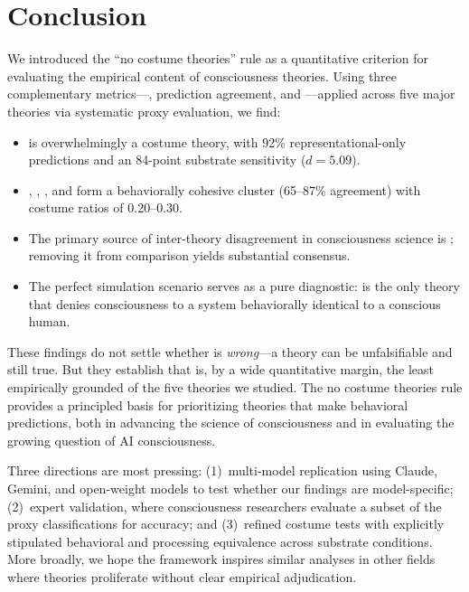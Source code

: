 \section{Conclusion}
\label{sec:conclusion}

We introduced the ``no costume theories'' rule as a quantitative criterion for evaluating the empirical content of consciousness theories.
Using three complementary metrics---\costumeratio, prediction agreement, and \costumesens---applied across five major theories via systematic proxy evaluation, we find:

\begin{itemize}[leftmargin=*,itemsep=2pt,topsep=2pt]
    \item \IIT is overwhelmingly a costume theory, with 92\% representational-only predictions and an 84-point substrate sensitivity ($d = 5.09$).
    \item \GNW, \HOT, \RPT, and \AST form a behaviorally cohesive cluster (65--87\% agreement) with costume ratios of 0.20--0.30.
    \item The primary source of inter-theory disagreement in consciousness science is \IIT; removing it from comparison yields substantial consensus.
    \item The perfect simulation scenario serves as a pure diagnostic: \IIT is the only theory that denies consciousness to a system behaviorally identical to a conscious human.
\end{itemize}

These findings do not settle whether \IIT is \emph{wrong}---a theory can be unfalsifiable and still true.
But they establish that \IIT is, by a wide quantitative margin, the least empirically grounded of the five theories we studied.
The no costume theories rule provides a principled basis for prioritizing theories that make behavioral predictions, both in advancing the science of consciousness and in evaluating the growing question of AI consciousness.

Three directions are most pressing:
(1)~multi-model replication using Claude, Gemini, and open-weight models to test whether our findings are model-specific;
(2)~expert validation, where consciousness researchers evaluate a subset of the proxy classifications for accuracy; and
(3)~refined costume tests with explicitly stipulated behavioral and processing equivalence across substrate conditions.
More broadly, we hope the \costumeratio framework inspires similar analyses in other fields where theories proliferate without clear empirical adjudication.
